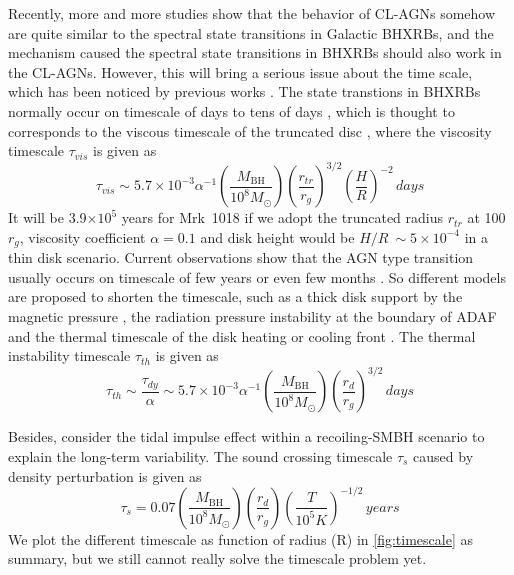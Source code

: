 \documentclass[twocolumn]{aastex63}
\begin{document}
Recently, more and more studies show that the behavior of CL-AGNs somehow are quite similar to the spectral state transitions in Galactic BHXRBs, and the mechanism caused the spectral state transitions in BHXRBs should also work in the CL-AGNs. However, this will bring a serious issue about the time scale, which has been noticed by previous works \citep[e.g. ][]{2018NatAs...2..102L,2018ApJ...864...27S,2018MNRAS.480.3898N,2020MNRAS.492.2335L}. The state transtions in BHXRBs normally occur on timescale of days to tens of days \citep{2009ApJ...701.1940Y,2010MNRAS.403...61D}, which is thought to corresponds to the viscous timescale of the truncated disc \citep[see reviews in ][]{2007A&ARv..15....1D}, where the viscosity timescale $\tau_{vis}$ is given as
\begin{equation}
\tau_{vis} \sim 5.7\times 10^{-3} \alpha^{-1}(\frac{M_\mathrm{BH}}{10^8M_{\odot}})(\frac{r_{tr}}{r_g})^{3/2} (\frac{H}{R})^{-2} \, days
\end{equation} It will be 3.9$\times 10^5$ years for Mrk~1018 if we adopt the truncated radius $r_{tr}$ at 100 $r_g$, viscosity coefficient $\alpha=0.1$ and disk height would be $H/R~\sim 5\times10^{-4}$ \citep[see also][]{2018MNRAS.480.3898N} in a thin disk scenario. Current observations show that the AGN type transition usually occurs on timescale of few years \citep[e.g.][]{2016A&A...593L...8M,2018ApJ...864...27S,2019MNRAS.483L..88P,2020MNRAS.492.2335L} or even few months \citep{2019ApJ...883...94T}. So different models are proposed to shorten the timescale, such as a thick disk support by the magnetic pressure \citep{2019MNRAS.483L..17D}, the radiation pressure instability at the boundary of ADAF \citep{2019arXiv190406767S} and the thermal timescale of the disk heating or cooling front \citep{2018ApJ...864...27S}. The thermal instability timescale $\tau_{th}$ is given as
\begin{equation}
\tau_{th} \sim \frac{\tau_{dy}}{\alpha} \sim 5.7\times 10^{-3} \alpha^{-1}(\frac{M_\mathrm{BH}}{10^8M_{\odot}})(\frac{r_d}{r_g})^{3/2} \, days
\end{equation}

Besides, \citet{2018ApJ...861...51K} consider the tidal impulse effect within a recoiling-SMBH scenario to explain the long-term variability. The sound crossing timescale $\tau_{s}$ caused by density perturbation is given as
\begin{equation}
\tau_{s}= 0.07 (\frac{M_\mathrm{BH}}{10^8M_{\odot}})(\frac{r_d}{r_g}) (\frac{T}{10^5 K})^{-1/2} \, years
\end{equation}  We plot the different timescale as function of radius (R) in \autoref{fig:timescale} as summary, but we still cannot really solve the timescale problem yet. 
\end{document}

